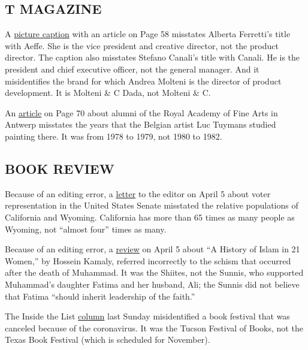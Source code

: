 \hypertarget{t-magazine}{%
\subsection{T MAGAZINE}\label{t-magazine}}

A
\href{https://www.nytimes3xbfgragh.onion/interactive/2020/04/13/t-magazine/italian-fashion-design-houses.html}{picture
caption} with an article on Page 58 misstates Alberta Ferretti's title
with Aeffe. She is the vice president and creative director, not the
product director. The caption also misstates Stefano Canali's title with
Canali. He is the president and chief executive officer, not the general
manager. And it misidentifies the brand for which Andrea Molteni is the
director of product development. It is Molteni \& C Dada, not Molteni \&
C.

An
\href{https://www.nytimes3xbfgragh.onion/interactive/2020/04/13/t-magazine/royal-academy-antwerp.html}{article}
on Page 70 about alumni of the Royal Academy of Fine Arts in Antwerp
misstates the years that the Belgian artist Luc Tuymans studied painting
there. It was from 1978 to 1979, not 1980 to 1982.

\hypertarget{book-review}{%
\subsection{BOOK REVIEW}\label{book-review}}

Because of an editing error, a
\href{https://www.nytimes3xbfgragh.onion/2020/04/03/books/review/freddy-the-pig-and-the-electoral-college-readers-respond.html}{letter}
to the editor on April 5 about voter representation in the United States
Senate misstated the relative populations of California and Wyoming.
California has more than 65 times as many people as Wyoming, not
``almost four'' times as many.

Because of an editing error, a
\href{https://www.nytimes3xbfgragh.onion/2020/03/13/books/review/history-of-islam-21-women-hossein-kamaly.html}{review}
on April 5 about ``A History of Islam in 21 Women,'' by Hossein Kamaly,
referred incorrectly to the schism that occurred after the death of
Muhammad. It was the Shiites, not the Sunnis, who supported Muhammad's
daughter Fatima and her husband, Ali; the Sunnis did not believe that
Fatima ``should inherit leadership of the faith.''

The Inside the List
\href{https://www.nytimes3xbfgragh.onion/2020/04/02/books/review/my-dark-vanessa-kate-elizabeth-russell.html}{column}
last Sunday misidentified a book festival that was canceled because of
the coronavirus. It was the Tucson Festival of Books, not the Texas Book
Festival (which is scheduled for November).

